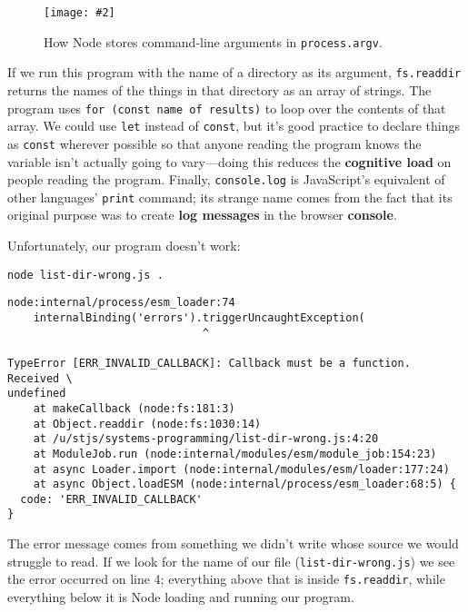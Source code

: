 \documentclass[krantzl]{krantz}
\newcommand{\figpdf}[4]{\begin{figure}%
\centering%
\texttt{[image: \#2]}%
\caption{#3}%
\label{#1}%
\end{figure}}
\newcommand{\glossref}[1]{\textbf{#1}}
\begin{document}
\figpdf{systems-programming-process-argv}{./systems-programming/process-argv.pdf}{How Node stores command-line arguments in \texttt{process.argv}.}{0.6}


\newpage


If we run this program with the name of a directory as its argument,
\texttt{fs.readdir} returns the names of the things in that directory as an array of strings.
The program uses \texttt{for (const name of results)} to loop over the contents of that array.
We could use \texttt{let} instead of \texttt{const},
but it’s good practice to declare things as \texttt{const} wherever possible
so that anyone reading the program knows the variable isn’t actually going to vary—doing
this reduces the \glossref{cognitive load} on people reading the program.
Finally,
\texttt{console.log} is JavaScript’s equivalent of other languages’ \texttt{print} command;
its strange name comes from the fact that
its original purpose was to create \glossref{log messages} in the browser \glossref{console}.


Unfortunately,
our program doesn’t work:


\begin{lstlisting}[frame=shadowbox]
node list-dir-wrong.js .
\end{lstlisting}



\begin{lstlisting}[frame=tblr,backgroundcolor=\color{black!5}]
node:internal/process/esm_loader:74
    internalBinding('errors').triggerUncaughtException(
                              ^

TypeError [ERR_INVALID_CALLBACK]: Callback must be a function. Received \
undefined
    at makeCallback (node:fs:181:3)
    at Object.readdir (node:fs:1030:14)
    at /u/stjs/systems-programming/list-dir-wrong.js:4:20
    at ModuleJob.run (node:internal/modules/esm/module_job:154:23)
    at async Loader.import (node:internal/modules/esm/loader:177:24)
    at async Object.loadESM (node:internal/process/esm_loader:68:5) {
  code: 'ERR_INVALID_CALLBACK'
}
\end{lstlisting}



\noindent The error message comes from something we didn’t write whose source we would struggle to read.
If we look for the name of our file (\texttt{list-dir-wrong.js})
we see the error occurred on line 4;
everything above that is inside \texttt{fs.readdir},
while everything below it is Node loading and running our program.
\end{document}
